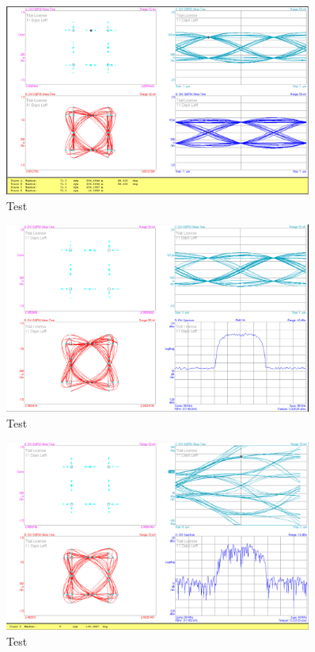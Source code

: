 \documentclass[12pt,a4paper,ngerman]{article}
\begin{document}
\begin{figure}[H]
\centering
\includegraphics[width=0.9\textwidth]{figures/Aufgabe3_OQPSK.jpg} 
\caption{Test}
\end{figure}


\pagebreak
\begin{figure}[H]
\centering
\includegraphics[width=0.9\textwidth]{figures/Aufgabe3_OQPSK_avg.jpg} 
\caption{Test}
\end{figure}

\begin{figure}[H]
\centering
\includegraphics[width=0.9\textwidth]{figures/Aufgabe3_OQPSK_phase.jpg} 
\caption{Test}
\end{figure}
\end{document}
